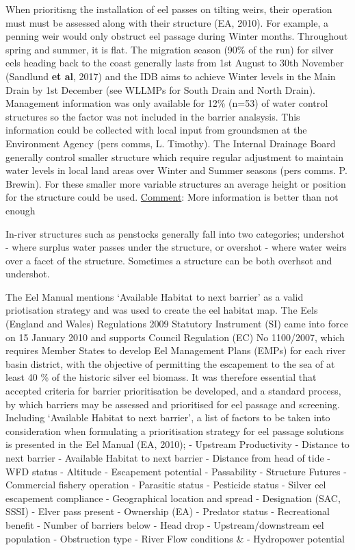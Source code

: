 \documentclass[]{article}
\begin{document}
When prioritisng the installation of eel passes on tilting weirs, their
operation must must be assessed along with their structure (EA, 2010).
For example, a penning weir would only obstruct eel passage during
Winter months. Throughout spring and summer, it is flat. The migration
season (90\% of the run) for silver eels heading back to the coast
generally lasts from 1st August to 30th November (Sandlund \textbf{et
al}, 2017) and the IDB aims to achieve Winter levels in the Main Drain
by 1st December (see WLLMPs for South Drain and North Drain). Management
information was only available for 12\% (n=53) of water control
structures so the factor was not included in the barrier analsysis. This
information could be collected with local input from groundsmen at the
Environment Agency (pers comms, L. Timothy). The Internal Drainage Board
generally control smaller structure which require regular adjustment to
maintain water levels in local land areas over Winter and Summer seasons
(pers comms. P. Brewin). For these smaller more variable structures an
average height or position for the structure could be used.
\href{}{Comment}: More information is better than not enough

In-river structures such as penstocks generally fall into two
categories; undershot - where surplus water passes under the structure,
or overshot - where water weirs over a facet of the structure. Sometimes
a structure can be both overhsot and undershot.

The Eel Manual mentions `Available Habitat to next barrier' as a valid
priotisation strategy and was used to create the eel habitat map. The
Eels (England and Wales) Regulations 2009 Statutory Instrument (SI) came
into force on 15 January 2010 and supports Council Regulation (EC) No
1100/2007, which requires Member States to develop Eel Management Plans
(EMPs) for each river basin district, with the objective of permitting
the escapement to the sea of at least 40 \% of the historic silver eel
biomass. It was therefore essential that accepted criteria for barrier
prioritisation be developed, and a standard process, by which barriers
may be assessed and prioritised for eel passage and screening. Including
`Available Habitat to next barrier', a list of factors to be taken into
consideration when formulating a prioritisation strategy for eel passage
solutions is presented in the Eel Manual (EA, 2010); - Upstream
Productivity - Distance to next barrier - Available Habitat to next
barrier - Distance from head of tide - WFD status - Altitude -
Escapement potential - Passability - Structure Futures - Commercial
fishery operation - Parasitic status - Pesticide status - Silver eel
escapement compliance - Geographical location and spread - Designation
(SAC, SSSI) - Elver pass present - Ownership (EA) - Predator status -
Recreational benefit - Number of barriers below - Head drop -
Upstream/downstream eel population - Obstruction type - River Flow
conditions \& - Hydropower potential
\end{document}
